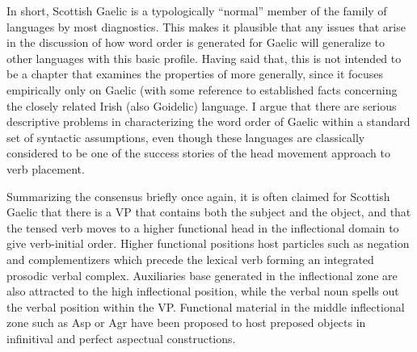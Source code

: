\documentclass[output=paper,colorlinks,citecolor=brown]{langscibook}
\begin{document}
In short, Scottish Gaelic is a typologically “normal” member of the  family of languages by most diagnostics. This makes it plausible that any issues that arise in the discussion of how word order is generated for Gaelic will generalize to other languages with this basic profile. Having said that, this is not intended to be a chapter that examines the properties of  more generally, since it focuses empirically only on Gaelic (with some reference to established facts concerning the closely related Irish (also Goidelic) language. I argue that there are serious descriptive problems in characterizing the word order of Gaelic within a standard set of syntactic assumptions, even though these languages are classically considered to be one of the success stories of the head movement approach to verb placement. 

Summarizing the consensus briefly once again, it is often claimed for Scottish Gaelic that there is a VP that contains both the subject and the object, and that the tensed verb moves to a higher functional head in the inflectional domain to give verb-initial order. Higher functional positions host particles such as negation and complementizers which precede the lexical verb forming an integrated prosodic verbal complex. Auxiliaries base generated in the inflectional zone are also attracted to the high inflectional position, while the verbal noun spells out the verbal position within the VP.  Functional material in the middle inflectional zone such as Asp or Agr have  been proposed to host preposed objects in infinitival and perfect aspectual constructions.   
\end{document}
